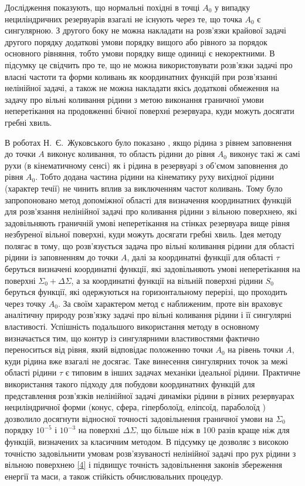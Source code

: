 \documentclass[11pt, reqno]{amsart}
\begin{document}
Дослідження показують, що нормальні похідні в точці $A_0$ у випадку нециліндричних резервуарів взагалі не існують через те, що точка $A_0$ є сингулярною. З другого боку не можна накладати на розв'язки крайової задачі другого порядку додаткові умови порядку вищого або рівного за порядок основного рівняння, тобто умови порядку вище одиниці є некоректними. В підсумку це свідчить про те, що не можна використовувати розв'язки задачі про власні частоти та форми коливань як координатних функцій при розв'язанні нелінійної задачі, а також не можна накладати якісь додаткові обмеження на задачу про вільні коливання рідини з метою виконання граничної умови неперетікання на продовженні бічної поверхні резервуара, куди можуть досягати гребні хвиль.

В роботах Н.~Є.~Жуковського було показано \cite{Zhu}, якщо рідина з рівнем заповнення до точки $A$ виконує коливання, то область рідини до рівня $A_0$ виконує такі ж самі рухи (в кінематичному сенсі) як і рідина в резервуарі з об'ємом заповнення до рівня $A_0$. Тобто додана частина рідини на кінематику руху вихідної рідини (характер течії) не чинить вплив за виключенням частот коливань. Тому було запропоновано метод допоміжної області \cite{Limgeo} для визначення координатних функцій для розв'язання нелінійної задачі про коливання рідини з вільною поверхнею, які задовільняють граничній умові неперетікання на стінках резервуара вище рівня незбуреної вільної поверхні, куди можуть досягати гребні хвиль. Ідея методу полягає в тому, що розв'язується задача про вільні коливання рідини для області рідини із заповненням до точки $A$, далі за координатні функції для області $\tau$ беруться визначені координатні функції, які задовільняють умові неперетікання на поверхні  $\Sigma_0+\Delta \Sigma$, а за координатні функції на вільній поверхні рідини $S_0$  беруться функції, які одержуються на горизонтальному перерізі, що проходить через точку  $A_0$. За своїм характером метод є наближеним, проте він враховує аналітичну природу розв'язку задачі про вільні коливання рідини і її сингулярні властивості. Успішність подальшого використання методу в основному визначається тим, що контур із сингулярними властивостями фактично переноситься від рівня, який відповідає положенню точки $A_0$ на рівень точки $A$, куди рідина вже взагалі не досягає. Таке винесення сингулярних точок за межі області рідини $\tau$ є типовим в інших задачах механіки ідеальної рідини. Практичне використання такого підходу для побудови координатних функцій для представлення розв'язків нелінійної задачі динаміки рідини в різних резервуарах нециліндричної форми (конус, сфера, гіперболоїд, еліпсоїд, параболоїд \cite{Kon,Limgeo}) дозволило досягнути відносної точності задовільнення граничної умови на $\Sigma_0$ порядку $10^{-5}$ і $10^{-3}$ на поверхні $\Delta \Sigma$, що більше ніж в 100 разів краще ніж для функцій, визначених за класичним методом. В підсумку це дозволяє з високою точністю задовільнити умовам розв'язуваності нелінійної задачі про рух рідини з вільною поверхнею \eqref{4} і підвищує точність задовільнення законів збереження енергії та маси, а також стійкість обчислювальних процедур.
\end{document}
